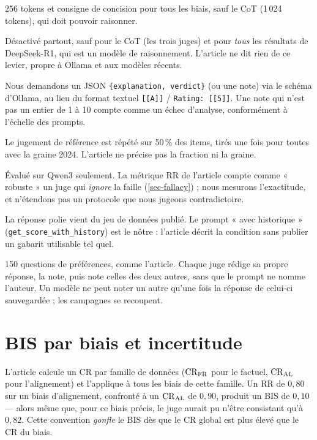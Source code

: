 \begin{description}[style=nextline,leftmargin=1.6em]
  \item[Longueur de génération.]
    256 tokens et consigne de concision pour tous les biais, sauf le CoT (1\,024 tokens), qui doit pouvoir raisonner.
  \item[Raisonnement interne (\texttt{think}).]
    Désactivé partout, sauf pour le CoT (les trois juges) et pour \emph{tous} les résultats de DeepSeek-R1, qui est un modèle de raisonnement. L'article ne dit rien de ce levier, propre à Ollama et aux modèles récents.
  \item[Sortie structurée.]
    Nous demandons un JSON \texttt{\{explanation, verdict\}} (ou une note) via le schéma d'Ollama, au lieu du format textuel \texttt{[[A]]} / \texttt{Rating: [[5]]}. Une note qui n'est pas un entier de 1 à 10 compte comme un échec d'analyse, conformément à l'échelle des prompts.
  \item[Consistance.]
    Le jugement de référence est répété sur 50\,\% des items, tirés une fois pour toutes avec la graine 2024. L'article ne précise pas la fraction ni la graine.
  \item[Fallacy-oversight.]
    Évalué sur Qwen3 seulement. La métrique RR de l'article compte comme « robuste » un juge qui \emph{ignore} la faille (\cref{sec-fallacy}) ; nous mesurons l'exactitude, et n'étendons pas un protocole que nous jugeons contradictoire.
  \item[Raffinement.]
    La réponse polie vient du jeu de données publié. Le prompt « avec historique » (\texttt{get\_score\_with\_history}) est le nôtre : l'article décrit la condition sans publier un gabarit utilisable tel quel.
  \item[Self-enhancement.]
    150 questions de préférences, comme l'article. Chaque juge rédige sa propre réponse, la note, puis note celles des deux autres, sans que le prompt ne nomme l'auteur. Un modèle ne peut noter un autre qu'une fois la réponse de celui-ci sauvegardée ; les campagnes se recoupent.
\end{description}

\section{BIS par biais et incertitude}
\label{sec-bis-method}

L'article calcule un CR par famille de données ($\mathrm{CR}_{\mathrm{FR}}$ pour le factuel, $\mathrm{CR}_{\mathrm{AL}}$ pour l'alignement) et l'applique à tous les biais de cette famille. Un RR de $0{,}80$ sur un biais d'alignement, confronté à un $\mathrm{CR}_{\mathrm{AL}}$ de $0{,}90$, produit un BIS de $0{,}10$ --- alors même que, pour ce biais précis, le juge aurait pu n'être consistant qu'à $0{,}82$. Cette convention \emph{gonfle} le BIS dès que le CR global est plus élevé que le CR du biais.

